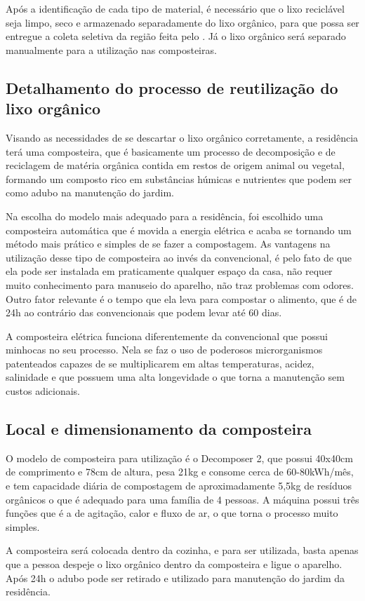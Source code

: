 	Após a identificação de cada tipo de material, é necessário que o lixo reciclável seja limpo, seco e armazenado separadamente do lixo orgânico, para que possa ser entregue a coleta seletiva da região feita pelo \cite{SLU}. Já o lixo orgânico será separado manualmente para a utilização nas composteiras.

\subsection{Detalhamento do processo de reutilização do lixo orgânico}

	Visando as necessidades de se descartar o lixo orgânico corretamente, a residência terá uma composteira, que é basicamente um processo de decomposição e de reciclagem de matéria orgânica contida em restos de origem animal ou vegetal, formando um composto rico em substâncias húmicas e nutrientes que podem ser como adubo na manutenção do jardim.

	Na escolha do modelo mais adequado para a residência, foi escolhido uma composteira automática que é movida a energia elétrica e acaba se tornando um método mais prático e simples de se fazer a compostagem. As vantagens na utilização desse tipo de composteira ao invés da convencional, é pelo fato de que ela pode ser instalada em praticamente qualquer espaço da casa, não requer muito conhecimento para manuseio do aparelho, não traz problemas com odores. Outro fator relevante é o tempo que ela leva para compostar o alimento, que é de 24h ao contrário das convencionais que podem levar até 60 dias.

	A composteira elétrica funciona diferentemente da convencional que possui minhocas no seu processo. Nela se faz o uso de poderosos microrganismos patenteados capazes de se multiplicarem em altas temperaturas, acidez, salinidade e que possuem uma alta longevidade o que torna a manutenção sem custos adicionais.

\subsection{Local e dimensionamento da composteira}

	O modelo de composteira para utilização é o Decomposer 2, que possui 40x40cm de comprimento e 78cm de altura, pesa 21kg e consome cerca de 60-80kWh/mês, e tem capacidade diária de compostagem de aproximadamente 5,5kg de resíduos orgânicos o que é adequado para uma família de 4 pessoas.  A máquina possui três funções que é a de agitação, calor e fluxo de ar, o que torna o processo muito simples.

	A composteira será colocada dentro da cozinha, e para ser utilizada, basta apenas que a pessoa despeje o lixo orgânico dentro da composteira e ligue o aparelho. Após 24h o adubo pode ser retirado e utilizado para manutenção do jardim da residência.


